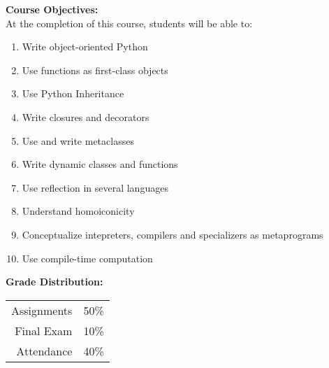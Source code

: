 \documentclass[11pt]{article}
\begin{document}
\textbf {\large Course Objectives:} \\
At the completion of this course, students will be able to:
\begin{enumerate} \itemsep-0.4em
  \item Write object-oriented Python
  \item Use functions as first-class objects
  \item Use Python Inheritance  
  \item Write closures and decorators
  \item Use and write metaclasses  
  \item Write dynamic classes and functions 
  \item Use reflection in several languages
  \item Understand homoiconicity
  \item Conceptualize intepreters, compilers and specializers as metaprograms
  \item Use compile-time computation
\end{enumerate}

\textbf {\large Grade Distribution:} \\
\hspace*{40mm}
\begin{tabular}{ r l }
Assignments & 50\% \\
Final Exam  & 10\% \\
Attendance  & 40\%
\end{tabular} \\\\

\newpage
\end{document}
